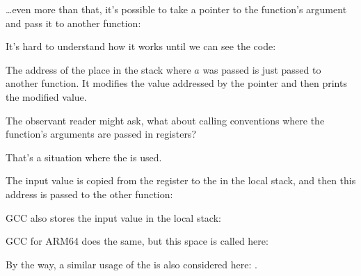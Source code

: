 \label{pointer_to_argument}

\dots even more than that, it's possible to take a pointer to the function's argument and pass
it to another function:



It's hard to understand how it works until we can see the code:



The address of the place in the stack where $a$ was passed is just passed to another function.
It modifies the value addressed by the pointer and then \printf prints the modified value.

\par The observant reader might ask, what about calling conventions where the function's arguments are
passed in registers?

That's a situation where the  is used.

The input value is copied from the register
to the  in the local stack, and then this address is passed to the other function:



GCC also stores the input value in the local stack:



GCC for ARM64 does the same, but this space is called  here:



By the way, a similar usage of the  is also considered here: .


